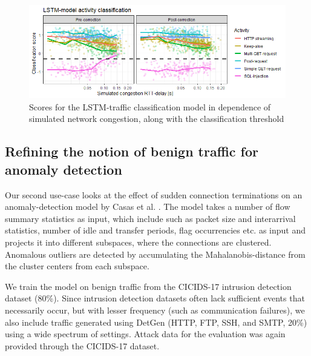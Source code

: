 \documentclass{article}
\begin{document}

\begin{figure}
\centering
\includegraphics[width=1\textwidth]{images/LSTM_exp.png}
\caption{Scores for the LSTM-traffic classification model in dependence of simulated network congestion, along with the classification threshold}\label{fig:LSTM_exp}
\end{figure}

\subsection{Refining the notion of benign traffic for anomaly detection}

Our second use-case looks at the effect of sudden connection terminations on an anomaly-detection model by Casas et al. \cite{casas2012unsupervised}. The model takes a number of flow summary statistics as input, which include such as packet size and interarrival statistics, number of idle and transfer periods, flag occurrencies etc. as input and projects it into different subspaces, where the connections are clustered. Anomalous outliers are detected by accumulating the Mahalanobis-distance from the cluster centers from each subspace.

We train the model on benign traffic from the CICIDS-17 intrusion detection dataset (80\%). Since intrusion detection datasets often lack sufficient events that necessarily occur, but with lesser frequency (such as communication failures), we also include traffic generated using DetGen (HTTP, FTP, SSH, and SMTP, 20\%) using a wide spectrum of settings. Attack data for the evaluation was again provided through the CICIDS-17 dataset.
\end{document}
